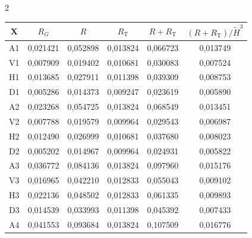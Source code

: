 \begin{multicols}{2}
\begin{table}[b]
\begin{center}
\begin{tabular}{|c|c|c|c|c|c|}
X & $R_G$ &  $R$ & $R_{\mathrm{T}}$ & $R+R_{\mathrm{T}}$ & 

$(R+R_{\mathrm{T}})/\tilde{H}^3$ \\

\hline

A1 & 0,021421 & 0,052898 & 0,013824 & 0,066723 & 0,013749\\


V1 & 0,007909 & 0,019402 & 0,010681 & 0,030083 & 0,007524\\


H1 & 0,013685 & 0,027911 & 0,011398 & 0,039309 & 0,008753\\


D1 & 0,005286 & 0,014373 & 0,009247 & 0,023619 & 0,005890\\


A2 & 0,023268 & 0,054725 & 0,013824 & 0,068549 & 0,013451\\


V2 & 0,007788 & 0,019579 & 0,009964 & 0,029543 & 0,006987\\


H2 & 0,012490 & 0,026999 & 0,010681 & 0,037680 & 0,008023\\


D2 & 0,005202 & 0,014967 & 0,009964 & 0,024931 & 0,005822\\


A3 & 0,036772 & 0,084136 & 0,013824 & 0,097960 & 0,015176\\


V3 & 0,016965 & 0,042210 & 0,012833 & 0,055043 & 0,009102\\


H3 & 0,022136 & 0,048502 & 0,012833 & 0,061335 & 0,009893\\


D3 & 0,014539 & 0,033993 & 0,011398 & 0,045392 & 0,007433\\


A4 & 0,041553 & 0,093684 & 0,013824 & 0,107509 & 0,016776\\


\end{tabular}
\end{center}
\end{table}
\end{multicols}
